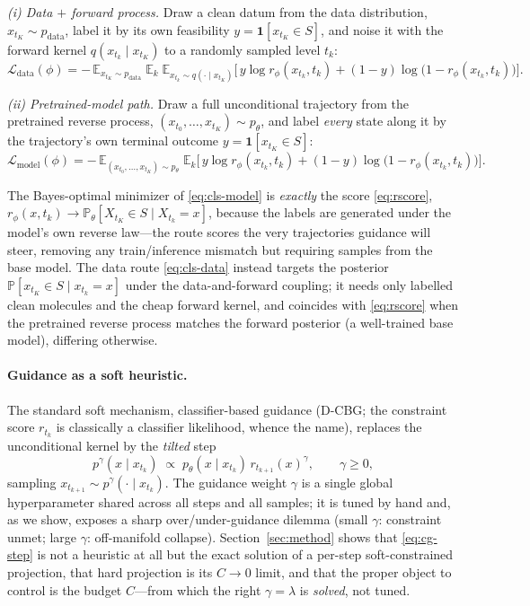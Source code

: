 \documentclass{article}
\newcommand{\E}{\mathbb{E}}
\begin{document}
\emph{(i) Data $+$ forward process.} Draw a clean datum from the data distribution, $x_{t_K}\sim p_{\mathrm{data}}$, label it by its own feasibility $y=\mathbf 1[x_{t_K}\in S]$, and noise it with the forward kernel $q(x_{t_k}\mid x_{t_K})$ to a randomly sampled level $t_k$:
\begin{equation}
\label{eq:cls-data}
\mathcal L_{\mathrm{data}}(\phi)=-\,\E_{x_{t_K}\sim p_{\mathrm{data}}}\;\E_{k}\;\E_{x_{t_k}\sim q(\cdot\mid x_{t_K})}\Big[\,y\log r_\phi(x_{t_k},t_k)+(1-y)\log\big(1-r_\phi(x_{t_k},t_k)\big)\Big].
\end{equation}

\emph{(ii) Pretrained-model path.} Draw a full unconditional trajectory from the pretrained reverse process, $(x_{t_0},\dots,x_{t_K})\sim p_\theta$, and label \emph{every} state along it by the trajectory's own terminal outcome $y=\mathbf 1[x_{t_K}\in S]$:
\begin{equation}
\label{eq:cls-model}
\mathcal L_{\mathrm{model}}(\phi)=-\,\E_{(x_{t_0},\dots,x_{t_K})\sim p_\theta}\;\E_{k}\Big[\,y\log r_\phi(x_{t_k},t_k)+(1-y)\log\big(1-r_\phi(x_{t_k},t_k)\big)\Big].
\end{equation}

The Bayes-optimal minimizer of \eqref{eq:cls-model} is \emph{exactly} the score \eqref{eq:rscore}, $r_\phi(x,t_k)\to\mathbb P_\theta[X_{t_K}\in S\mid X_{t_k}=x]$, because the labels are generated under the model's own reverse law---the route scores the very trajectories guidance will steer, removing any train/inference mismatch but requiring samples from the base model. The data route \eqref{eq:cls-data} instead targets the posterior $\mathbb P[x_{t_K}\in S\mid x_{t_k}=x]$ under the data-and-forward coupling; it needs only labelled clean molecules and the cheap forward kernel, and coincides with \eqref{eq:rscore} when the pretrained reverse process matches the forward posterior (a well-trained base model), differing otherwise.

\paragraph{Guidance as a soft heuristic.} The standard soft mechanism, classifier-based guidance (D-CBG; the constraint score $r_{t_k}$ is classically a classifier likelihood, whence the name), replaces the unconditional kernel by the \emph{tilted} step
\begin{equation}
\label{eq:cg-step}
p^{\gamma}(x\mid x_{t_k})\;\propto\;p_\theta(x\mid x_{t_k})\,r_{t_{k+1}}(x)^{\gamma},
\qquad \gamma\ge 0,
\end{equation}
sampling $x_{t_{k+1}}\sim p^\gamma(\cdot\mid x_{t_k})$. The guidance weight $\gamma$ is a single global hyperparameter shared across all steps and all samples; it is tuned by hand and, as we show, exposes a sharp over/under-guidance dilemma (small $\gamma$: constraint unmet; large $\gamma$: off-manifold collapse). Section~\ref{sec:method} shows that \eqref{eq:cg-step} is not a heuristic at all but the exact solution of a per-step soft-constrained projection, that hard projection is its $C\to0$ limit, and that the proper object to control is the budget $C$---from which the right $\gamma=\lambda$ is \emph{solved}, not tuned.
\end{document}

